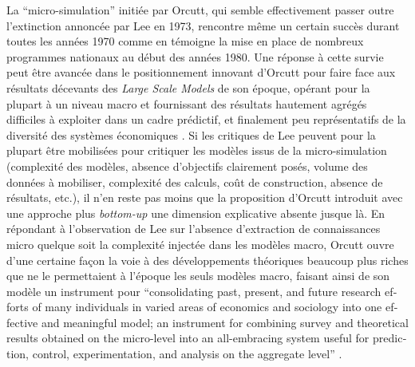 La \enquote{micro-simulation} initiée par Orcutt, qui semble effectivement passer outre l'extinction annoncée par Lee en 1973, rencontre même un certain succès durant toutes les années 1970 comme en témoigne la mise en place de nombreux programmes nationaux au début des années 1980. \autocite{Baroni2007} Une réponse à cette survie peut être avancée dans le positionnement innovant d'Orcutt pour faire face aux résultats décevants des \textit{Large Scale Models} de son époque, opérant pour la plupart à un niveau macro et fournissant des résultats hautement agrégés difficiles à exploiter dans un cadre prédictif, et finalement peu représentatifs de la diversité des systèmes économiques \autocites{Birkin2012, Baroni2007}. Si les critiques de Lee peuvent pour la plupart être mobilisées pour critiquer les modèles issus de la micro-simulation (complexité des modèles, absence d'objectifs clairement posés, volume des données à mobiliser, complexité des calculs, coût de construction, absence de résultats, etc.), il n'en reste pas moins que la proposition d'Orcutt introduit avec une approche plus \textit{bottom-up} une dimension explicative absente jusque là. En répondant à l'observation de Lee sur l'absence d'extraction de connaissances micro quelque soit la complexité injectée dans les modèles macro, Orcutt ouvre d'une certaine façon la voie à des développements théoriques beaucoup plus riches que ne le permettaient à l'époque les seuls modèles macro, faisant ainsi de son modèle un instrument pour \foreignquote{english}{consolidating past, present, and future research efforts of many individuals in varied areas of economics and sociology into one effective and meaningful model; an instrument for combining survey and theoretical results obtained on the micro-level into an all-embracing system useful for prediction, control, experimentation, and analysis on the aggregate level} \autocite[122]{Cohen1961}.

